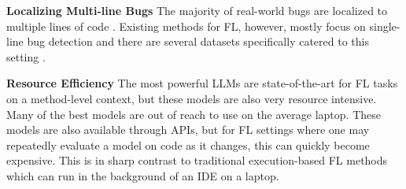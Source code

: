 \textbf{Localizing Multi-line Bugs}
The majority of real-world bugs are localized to multiple lines of code \citep{pearson2016evaluating}.
Existing methods for FL, however, mostly focus on single-line bug detection \citep{hirsch2020fault} and there are several datasets specifically catered to this setting \citep{karampatsis2020often, richter2022tssb}.



\textbf{Resource Efficiency}
The most powerful LLMs are state-of-the-art for FL tasks on a method-level context, but these models are also very resource intensive. Many of the best models are out of reach to use on the average laptop. These models are also available through APIs, but for FL settings where one may repeatedly evaluate a model on code as it changes, this can quickly become expensive. This is in sharp contrast to traditional execution-based FL methods which can run in the background of an IDE on a laptop.


